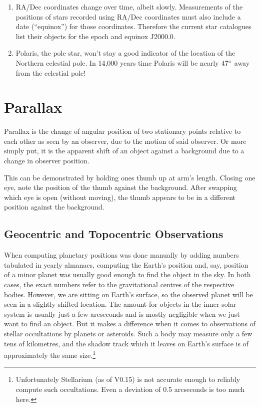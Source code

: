 \begin{enumerate}
\item RA/Dec coordinates change over time, albeit slowly. Measurements
  of the positions of stars recorded using RA/Dec coordinates must
  also include a date (``equinox'') for those coordinates. Therefore
  the current star catalogues list their objects for the epoch and
  equinox J2000.0.
\item
  Polaris, the pole star, won't stay a good indicator of the location of
  the Northern celestial pole. In 14,000 years time Polaris will be
  nearly $47\degree$ away from the celestial pole!
\end{enumerate}


\section{Parallax}
\label{sec:Concepts:Parallax}


Parallax is the change of angular position of two stationary points
relative to each other as seen by an observer, due to the motion of said
observer. Or more simply put, it is the apparent shift of an object
against a background due to a change in observer position.

This can be demonstrated by holding ones thumb up at arm's length.
Closing one eye, note the position of the thumb against the background.
After swapping which eye is open (without moving), the thumb appears to
be in a different position against the background.

\subsection{Geocentric and Topocentric Observations}
\label{sec:Concepts:Topocentric}


When computing planetary positions was done manually by adding numbers
tabulated in yearly almanacs, computing the Earth's position and, say,
position of a minor planet was usually good enough to find the object
in the sky. In both cases, the exact numbers refer to the
gravitational centres of the respective bodies. However, we are
sitting on Earth's surface, so the observed planet will be seen in a
slightly shifted location. The amount for objects in the inner solar
system is usually just a few arcseconds and is mostly negligible when we
just want to find an object. But it makes a difference when it comes
to observations of stellar occultations by planets or asteroids. Such
a body may measure only a few tens of kilometres, and the shadow track
which it leaves on Earth's surface is of approximately the same
size.\footnote{Unfortunately Stellarium (as of V0.15) is not accurate
  enough to reliably compute such occultations. Even a deviation of
  0.5 arcseconds is too much here.}

